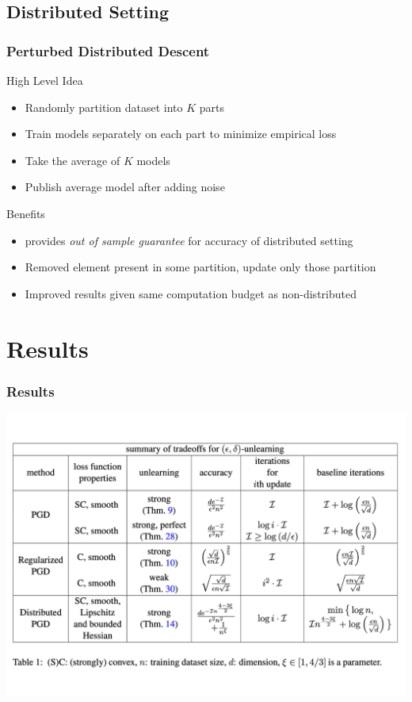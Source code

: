 \documentclass[pdf]{beamer}
\begin{document}
\subsection{Distributed Setting}
\begin{frame}
    \frametitle{Perturbed Distributed Descent}
    High Level Idea
    \begin{itemize}
        \item Randomly partition dataset into $K$ parts
        \item Train models separately on each part to minimize empirical loss
        \item Take the average of $K$ models 
        \item Publish average model after adding noise  
    \end{itemize}
    Benefits 
    \begin{itemize}
        \item \cite{JMLR:v14:zhang13b} provides \textit{out of sample guarantee} for accuracy of distributed setting
        \item Removed element present in some partition, update only those partition
        \item Improved results given same computation budget as non-distributed
    \end{itemize}

\end{frame}

\section{Results}
\begin{frame}
    \frametitle{Results}
    \includegraphics[width=\textwidth]{results.pdf}
\end{frame}
\end{document}
